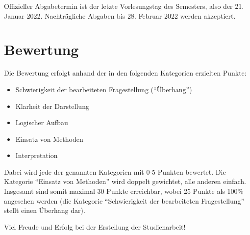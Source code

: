 \documentclass[11pt,a4paper]{article}
\begin{document}
Offizieller Abgabetermin ist der letzte Vorlesungstag des Semesters, also der 21. Januar 2022. Nachträgliche Abgaben bis 28. Februar 2022 werden akzeptiert.

\section*{Bewertung}
Die Bewertung erfolgt anhand der in den folgenden Kategorien erzielten Punkte:
\begin{itemize}
	\item Schwierigkeit der bearbeiteten Fragestellung ("`Überhang"')
	\item Klarheit der Darstellung
	\item Logischer Aufbau
	\item Einsatz von Methoden
	\item Interpretation
\end{itemize}
Dabei wird jede der genannten Kategorien mit 0-5 Punkten bewertet. Die Kategorie "`Einsatz von Methoden"' wird doppelt gewichtet, alle anderen einfach. Insgesamt sind somit maximal 30 Punkte erreichbar, wobei 25 Punkte als 100\% angesehen werden (die Kategorie "`Schwierigkeit der bearbeiteten Fragestellung"' stellt einen Überhang dar).
\vspace{3cm}
\begin{center}
	Viel Freude und Erfolg bei der Erstellung der Studienarbeit!
\end{center}
\end{document}
